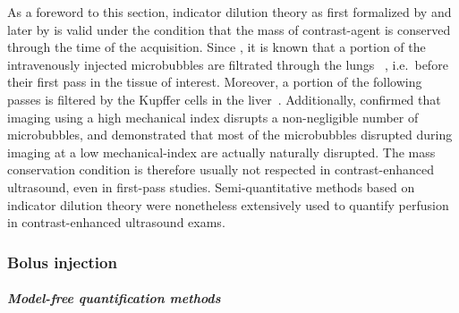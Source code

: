 As a foreword to this section, indicator dilution theory as first formalized by \citet{Stewart:1897dz} and later by \citet{Hamilton:1932ww} is valid under the condition that the mass of contrast-agent is conserved through the time of the acquisition. 
Since \citeyear{Butler:1979wu}, it is known that a portion of the intravenously injected microbubbles are filtrated through the lungs~\cite{Butler:1979wu,Meltzer:1980js}
, i.e.~before their first pass in the tissue of interest.
Moreover, a portion of the following passes is filtered by the Kupffer cells in the liver~\cite{Kindberg:2003iq,Yanagisawa:2007bu}.
Additionally, \citet{Lampaskis:2010fj} %
confirmed that imaging using a high mechanical index disrupts a non-negligible number of microbubbles, and demonstrated that most of the microbubbles disrupted during imaging at a low mechanical-index are actually naturally disrupted. 
The mass conservation condition is therefore usually not respected in contrast-enhanced ultrasound, even in first-pass studies.
Semi-quantitative methods based on indicator dilution theory were nonetheless extensively used to quantify perfusion in contrast-enhanced ultrasound exams.

\subsubsection{Bolus injection}
\label{SQ:US:Bolus}

\paragraph{\em{Model-free quantification methods}\\}

